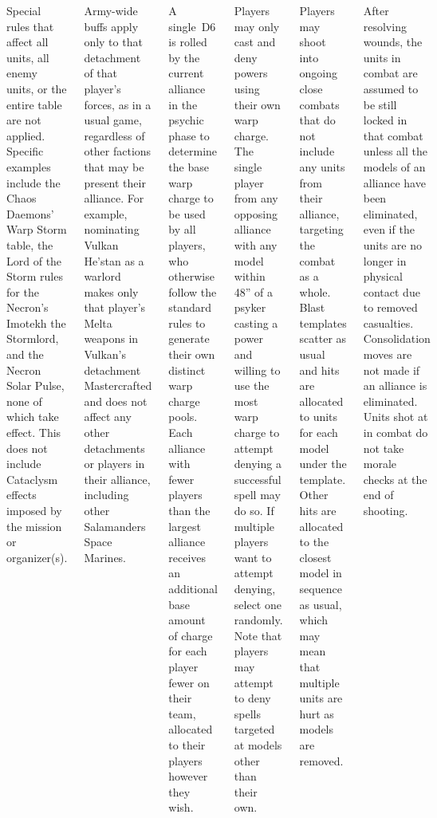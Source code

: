 \documentclass{40k}
\begin{document}
\begin{columns}

Special rules that affect all units, all enemy units, or the entire
table are not applied.  Specific examples include the Chaos Daemons'
Warp Storm table, the Lord of the Storm rules for the Necron's Imotekh
the Stormlord, and the Necron Solar Pulse, none of which take effect.
This does not include Cataclysm effects imposed by the mission or
organizer(s).

Army-wide buffs apply only to that detachment of that player's forces,
as in a usual game, regardless of other factions that may be present
their alliance.  For example, nominating Vulkan He'stan as a warlord
makes only that player's Melta weapons in Vulkan's detachment
Mastercrafted and does not affect any other detachments or players in
their alliance, including other Salamanders Space Marines.


A single~D6 is rolled by the current alliance in the psychic phase to
determine the base warp charge to be used by all players, who
otherwise follow the standard rules to generate their own distinct
warp charge pools.  Each alliance with fewer players than the largest
alliance receives an additional base amount of charge for each player
fewer on their team, allocated to their players however they wish.

Players may only cast and deny powers using their own warp charge.
The single player from any opposing alliance with any model within
48'' of a psyker casting a power and willing to use the most warp
charge to attempt denying a successful spell may do so.  If multiple
players want to attempt denying, select one randomly.  Note that
players may attempt to deny spells targeted at models other than their
own.



Players may shoot into ongoing close combats that do not include any
units from their alliance, targeting the combat as a whole.  Blast
templates scatter as usual and hits are allocated to units for each
model under the template.  Other hits are allocated to the closest
model in sequence as usual, which may mean that multiple units are
hurt as models are removed.

After resolving wounds, the units in combat are assumed to be still
locked in that combat unless all the models of an alliance have been
eliminated, even if the units are no longer in physical contact due to
removed casualties.  Consolidation moves are not made if an alliance
is eliminated.  Units shot at in combat do not take morale checks at
the end of shooting.


\end{columns}
\end{document}
